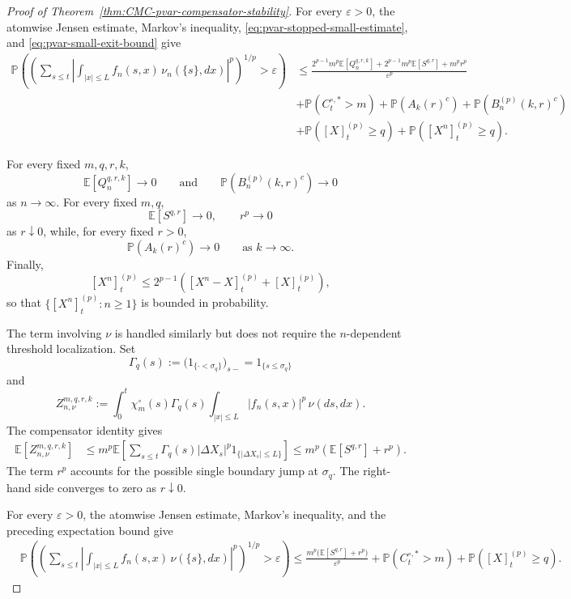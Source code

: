 \documentclass[a4paper,10pt]{article}
\newcommand{\E}{\mathbb E}
\renewcommand{\P}{\mathbb P}
\begin{document}
\begin{proof}[Proof of Theorem~\ref{thm:CMC-pvar-compensator-stability}]
For every \(\varepsilon>0\), the atomwise Jensen estimate,
Markov's inequality, \eqref{eq:pvar-stopped-small-estimate},
and \eqref{eq:pvar-small-exit-bound} give
\begin{align}
\P\left(
\left(
\sum_{s\le t}
\left|
\int_{|x|\le L}
f_n(s,x)\,\nu_n(\{s\},dx)
\right|^p
\right)^{1/p}
>
\varepsilon
\right)
&\le
\frac{
2^{p-1}m^p\E[Q_n^{q,r,k}]
+
2^{p-1}m^p\E[S^{q,r}]
+
m^pr^p
}{
\varepsilon^p
}
\nonumber\\
&+
\P(C_t^{\circ,*}>m)
+
\P(A_k(r)^c)
+
\P(B_n^{(p)}(k,r)^c)
\nonumber\\
&+
\P([X]^{(p)}_t\ge q)
+
\P([X^n]^{(p)}_t\ge q).
\label{eq:pvar-small-nun-probability}
\end{align}

For every fixed \(m,q,r,k\),
\[
        \E[Q_n^{q,r,k}]\longrightarrow0
        \qquad\text{and}\qquad
        \P(B_n^{(p)}(k,r)^c)\longrightarrow0
\]
as \(n\to\infty\). For every fixed \(m,q\),
\[
        \E[S^{q,r}]\longrightarrow0,
        \qquad
        r^p\longrightarrow0
\]
as \(r\downarrow0\), while, for every fixed \(r>0\),
\[
        \P(A_k(r)^c)\longrightarrow0
        \qquad\text{as }k\to\infty.
\]
Finally,
\[
[X^n]^{(p)}_t
\le
2^{p-1}
\left(
[X^n-X]^{(p)}_t+[X]^{(p)}_t
\right),
\]
so that
$
        \{[X^n]^{(p)}_t:n\ge1\}
$
is bounded in probability.

The term involving \(\nu\) is handled similarly but does not require
the \(n\)-dependent threshold localization. Set
\[
        \Gamma_q(s)
        :=
        \bigl(1_{\{\cdot<\sigma_q\}}\bigr)_{s-}
        =
        1_{\{s\le\sigma_q\}}
\]
and
\[
Z_{n,\nu}^{m,q,r,k}
:=
\int_0^t
\chi_m^\circ(s)\Gamma_q(s)
\int_{|x|\le L}
|f_n(s,x)|^p\,\nu(ds,dx).
\]
The compensator identity gives
\[
\begin{aligned}
\E[Z_{n,\nu}^{m,q,r,k}]
&\le
m^p
\E\left[
\sum_{s\le t}
\Gamma_q(s)
|\Delta X_s|^p
1_{\{|\Delta X_s|\le L\}}
\right]
\le
m^p\left(
\E[S^{q,r}]+r^p
\right).
\end{aligned}
\]
The term \(r^p\) accounts for the possible single boundary jump at
\(\sigma_q\). The right-hand side converges to zero as
\(r\downarrow0\).

For every \(\varepsilon>0\), the atomwise Jensen estimate,
Markov's inequality, and the preceding expectation bound give
\begin{align}
&\P\left(
\left(
\sum_{s\le t}
\left|
\int_{|x|\le L}
f_n(s,x)\,\nu(\{s\},dx)
\right|^p
\right)^{1/p}
>
\varepsilon
\right)
\le
\frac{
m^p\bigl(\E[S^{q,r}]+r^p\bigr)
}{
\varepsilon^p
}
+
\P(C_t^{\circ,*}>m)
+
\P([X]^{(p)}_t\ge q).
\label{eq:pvar-small-nu-probability}
\end{align}


\end{proof}
\end{document}
